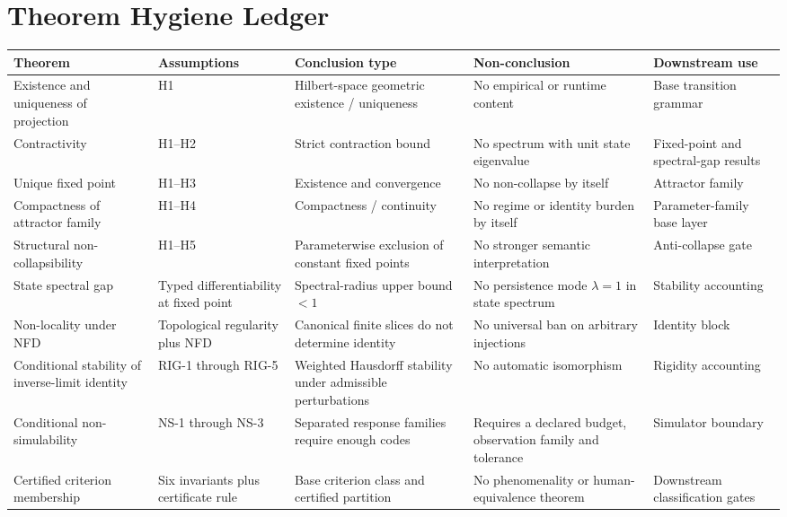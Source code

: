 \section{Theorem Hygiene Ledger}

\renewcommand{\arraystretch}{1.12}
\footnotesize
\begin{tabularx}{\textwidth}{P{0.18\textwidth} P{0.16\textwidth} P{0.17\textwidth} P{0.22\textwidth} Y}
\toprule
\textbf{Theorem} & \textbf{Assumptions} & \textbf{Conclusion type} & \textbf{Non-conclusion} & \textbf{Downstream use} \\
\midrule
Existence and uniqueness of projection & H1 & Hilbert-space geometric existence / uniqueness & No empirical or runtime content & Base transition grammar \\
Contractivity & H1--H2 & Strict contraction bound & No spectrum with unit state eigenvalue & Fixed-point and spectral-gap results \\
Unique fixed point & H1--H3 & Existence and convergence & No non-collapse by itself & Attractor family \\
Compactness of attractor family & H1--H4 & Compactness / continuity & No regime or identity burden by itself & Parameter-family base layer \\
Structural non-collapsibility & H1--H5 & Parameterwise exclusion of constant fixed points & No stronger semantic interpretation & Anti-collapse gate \\
State spectral gap & Typed differentiability at fixed point & Spectral-radius upper bound $<1$ & No persistence mode $\lambda=1$ in state spectrum & Stability accounting \\
Non-locality under NFD & Topological regularity plus NFD & Canonical finite slices do not determine identity & No universal ban on arbitrary injections & Identity block \\
Conditional stability of inverse-limit identity & RIG-1 through RIG-5 & Weighted Hausdorff stability under admissible perturbations & No automatic isomorphism & Rigidity accounting \\
Conditional non-simulability & NS-1 through NS-3 & Separated response families require enough codes & Requires a declared budget, observation family and tolerance & Simulator boundary \\
Certified criterion membership & Six invariants plus certificate rule & Base criterion class and certified partition & No phenomenality or human-equivalence theorem & Downstream classification gates \\
\bottomrule
\end{tabularx}
\normalsize

